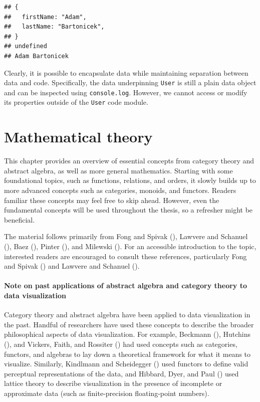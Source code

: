 \documentclass[
]{book}
\theoremstyle{definition}
\theoremstyle{definition}
\theoremstyle{definition}
\theoremstyle{definition}
\theoremstyle{remark}
\begin{document}
\begin{verbatim}
## {
##   firstName: "Adam",
##   lastName: "Bartonicek",
## }
## undefined
## Adam Bartonicek
\end{verbatim}

Clearly, it is possible to encapsulate data while maintaining separation between data and code. Specifically, the data underpinning \texttt{User} is still a plain data object and can be inspected using \texttt{console.log}. However, we cannot access or modify its properties outside of the \texttt{User} code module.

\newcommand\thenb{⨾}

\chapter{Mathematical theory}\label{mathematical-theory}

This chapter provides an overview of essential concepts from category theory and abstract algebra, as well as more general mathematics. Starting with some foundational topics, such as functions, relations, and orders, it slowly builds up to more advanced concepts such as categories, monoids, and functors. Readers familiar these concepts may feel free to skip ahead. However, even the fundamental concepts will be used throughout the thesis, so a refresher might be beneficial.

The material follows primarily from Fong and Spivak (), Lawvere and Schanuel (), Baez (), Pinter (), and Milewski (). For an accessible introduction to the topic, interested readers are encouraged to consult these references, particularly Fong and Spivak () and Lawvere and Schanuel ().

\subsubsection{Note on past applications of abstract algebra and category theory to data visualization}\label{note-on-past-applications-of-abstract-algebra-and-category-theory-to-data-visualization}

Category theory and abstract algebra have been applied to data visualization in the past. Handful of researchers have used these concepts to describe the broader philosophical aspects of data visualization. For example, Beckmann (), Hutchins (), and Vickers, Faith, and Rossiter () had used concepts such as categories, functors, and algebras to lay down a theoretical framework for what it means to visualize. Similarly, Kindlmann and Scheidegger () used functors to define valid perceptual representations of the data, and Hibbard, Dyer, and Paul () used lattice theory to describe visualization in the presence of incomplete or approximate data (such as finite-precision floating-point numbers).
\end{document}
